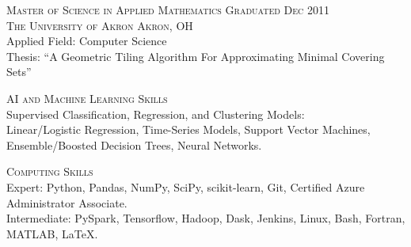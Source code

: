 \documentclass[letterpaper, 10pt]{article} %
\begin{document}
\textsc{Master of Science in Applied Mathematics} \hfill \textsc{Graduated Dec 2011} \\
\textsc{The University of Akron \hfill Akron, OH} \\
Applied Field: Computer Science \\
Thesis: ``A Geometric Tiling Algorithm For Approximating Minimal Covering Sets'' \





\textsc{AI and Machine Learning Skills} \\
    Supervised Classification, Regression, and Clustering Models: \\
    Linear/Logistic Regression,
    Time-Series Models,
    Support Vector Machines,
    Ensemble/Boosted Decision Trees,
    Neural Networks.

    
\textsc{Computing Skills} \\
    Expert:
        Python,
        Pandas,
        NumPy,
        SciPy,
        scikit-learn,
        Git,
        Certified Azure Administrator Associate. \\
    Intermediate:
        PySpark,
        Tensorflow,
        Hadoop,
        Dask,
        Jenkins,
        Linux,
        Bash,
        Fortran,
        MATLAB,
        \LaTeX. \\

\vspace*{\fill}
\end{document}
